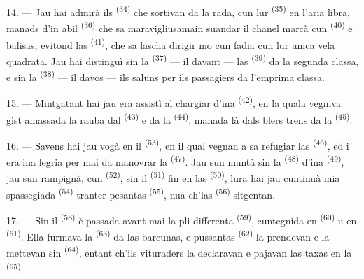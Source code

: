 \VUsaut{4.0mm}
\VUsaut{3.0mm}

14. --- Jau hai admirà ils  \textsuperscript{(34)} che sortivan da la
rada, cun lur  \textsuperscript{(35)} en l'aria libra, manads d'in abil
 \textsuperscript{(36)} che sa maravigliusamain suandar il chanel marcà cun
 \textsuperscript{(40)} e balisas, evitond las 
\textsuperscript{(41)}, che sa lascha dirigir mo cun fadia cun lur unica vela quadrata.
Jau hai distinguì sin la  \textsuperscript{(37)} --- il davant --- las
 \textsuperscript{(39)} da la segunda classa, e sin la 
\textsuperscript{(38)} --- il davos --- ils saluns per ils passagiers da l'emprima
classa.

15. --- Mintgatant hai jau era assistì al chargiar d'ina 
\textsuperscript{(42)}, en la quala vegniva gist amassada la rauba dal 
\textsuperscript{(43)} e da la  \textsuperscript{(44)}, manada là dals
blers trens da la  \textsuperscript{(45)}.

\VUsaut{3.0mm}
\VUsaut{3.0mm}

16. --- Savens hai jau vogà en il  \textsuperscript{(53)}, en il qual
vegnan a sa refugiar las  \textsuperscript{(46)}, ed i era ina legria per mai
da manovrar la  \textsuperscript{(47)}. Jau sun muntà sin la 
\textsuperscript{(48)} d'ina  \textsuperscript{(49)}, jau sun rampignà,
cun  \textsuperscript{(52)}, sin il  \textsuperscript{(51)} fin en
las  \textsuperscript{(50)}, lura hai jau cuntinuà mia spassegiada
 \textsuperscript{(54)} tranter pesantas 
\textsuperscript{(55)}, nua ch'las  \textsuperscript{(56)} sitgentan.

17. --- Sin il  \textsuperscript{(58)} è passada avant mai la pli differenta
 \textsuperscript{(59)}, cuntegnida en  \textsuperscript{(60)} u
en  \textsuperscript{(61)}. Ella furmava la 
\textsuperscript{(63)} da las barcunas, e pussantas  \textsuperscript{(62)} la
prendevan e la mettevan sin  \textsuperscript{(64)}, entant ch'ils
vituraders la declaravan e pajavan las taxas en la  \textsuperscript{(65)}.


